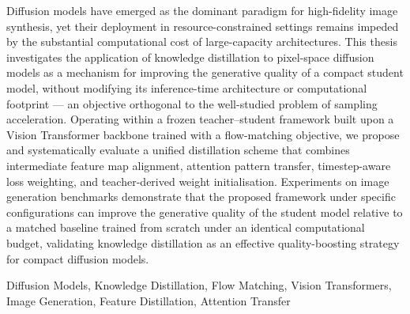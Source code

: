 \begin{abstracteng}

Diffusion models have emerged as the dominant paradigm for high-fidelity image
synthesis, yet their deployment in resource-constrained settings remains impeded by
the substantial computational cost of large-capacity architectures. This thesis
investigates the application of knowledge distillation to pixel-space diffusion models
as a mechanism for improving the generative quality of a compact student model,
without modifying its inference-time architecture or computational footprint --- an
objective orthogonal to the well-studied problem of sampling acceleration. Operating
within a frozen teacher--student framework built upon a Vision Transformer backbone
trained with a flow-matching objective, we propose and systematically evaluate a
unified distillation scheme that combines intermediate feature map alignment,
attention pattern transfer, timestep-aware loss weighting, and teacher-derived weight
initialisation. Experiments on image generation benchmarks demonstrate that the
proposed framework under specific configurations can improve the generative quality of the student model
relative to a matched baseline trained from scratch under an identical computational
budget, validating knowledge distillation as an effective quality-boosting strategy for
compact diffusion models.

   \begin{keywordseng}
      Diffusion Models, Knowledge Distillation, Flow Matching, Vision Transformers,
      Image Generation, Feature Distillation, Attention Transfer
   \end{keywordseng}
\end{abstracteng}
